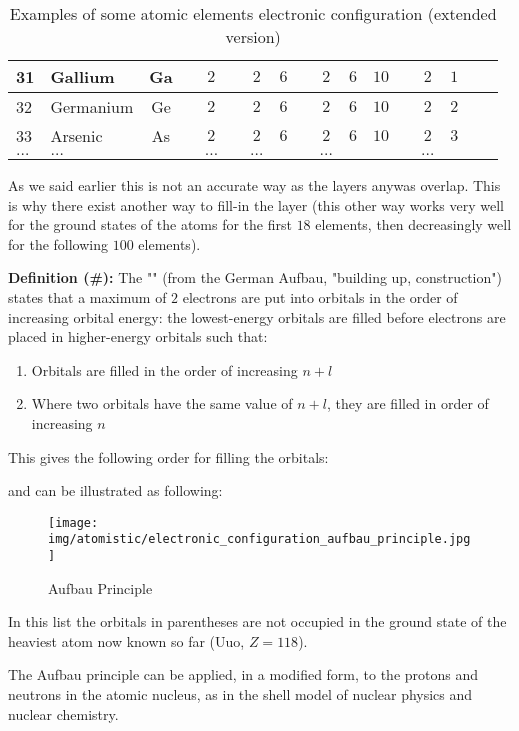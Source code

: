 \begin{table}[H]
\begin{center}
\begin{tabular}{|l|lc|c|c|c|c|c|c|c|c|c|c|c|c|c|c|}
				31 & Gallium & Ga & & $2$ & & $2$ & $6$ & & $2$ & $6$ & $10$ & & $2$ & $1$ \\ \hline
				32 & Germanium & Ge & & $2$ & & $2$ & $6$ & & $2$ & $6$ & $10$ & & $2$ & $2$ \\ \hline
				33 & Arsenic & As & & $2$ & & $2$ & $6$ & & $2$ & $6$ & $10$ & & $2$ & $3$ \\ \hline
				$\ldots$ & $\ldots$ & & & $\ldots$ & & $\ldots$ & & & $\ldots$ & & & & $\ldots$  \\ \hline
			\end{tabular}
		\end{center}
		\caption{Examples of some atomic elements electronic configuration (extended version)}
	\end{table}
	As we said earlier this is not an accurate way as the layers anywas overlap. This is why there exist another way to fill-in the layer (this other way works very well for the ground states of the atoms for the first $18$ elements, then decreasingly well for the following $100$ elements).

	\pagebreak
	\textbf{Definition (\#\mydef):} The "" (from the German Aufbau, "building up, construction") states that a maximum of $2$ electrons are put into orbitals in the order of increasing orbital energy: the lowest-energy orbitals are filled before electrons are placed in higher-energy orbitals such that:
	\begin{enumerate}
		\item Orbitals are filled in the order of increasing $n+l$

		\item Where two orbitals have the same value of $n+l$, they are filled in order of increasing $n$
	\end{enumerate}
	This gives the following order for filling the orbitals:
	
	and can be illustrated as following:
	\begin{figure}[H]
		\centering
		\texttt{[image: img/atomistic/electronic\_configuration\_aufbau\_principle.jpg]}
		\caption{Aufbau Principle}
	\end{figure}
	In this list the orbitals in parentheses are not occupied in the ground state of the heaviest atom now known so far (Uuo, $Z = 118$).
	
	The Aufbau principle can be applied, in a modified form, to the protons and neutrons in the atomic nucleus, as in the shell model of nuclear physics and nuclear chemistry.
	

